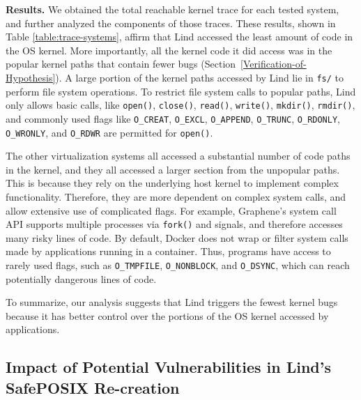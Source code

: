 {{{\noindent
\textbf{Results.}
We obtained the total reachable kernel trace for
each tested system,
and further analyzed the components of those traces. These results,
shown in Table \ref{table:trace-systems}, affirm that Lind accessed the
least amount of code in the OS
kernel. More importantly, all the kernel code it did access was in the
popular kernel paths that contain fewer bugs (Section~{\ref{Verification-of-Hypothesis}}).
A large portion of the kernel paths accessed by Lind lie in
\texttt{fs/} to perform file system operations.
To restrict file system calls to popular paths, Lind only allows basic calls,
like \texttt{open()}, \texttt{close()}, \texttt{read()}, \texttt{write()}, \texttt{mkdir()},
\texttt{rmdir()}, and commonly used flags like \texttt{O\_CREAT}, \texttt{O\_EXCL},
 \texttt{O\_APPEND}, \texttt{O\_TRUNC},
\texttt{O\_RDONLY}, \texttt{O\_WRONLY}, and \texttt{O\_RDWR} are
permitted for \texttt{open()}.

The other virtualization systems all accessed a substantial number of code
paths in the kernel, and they all accessed a larger section from the unpopular
paths. This is because they rely on the underlying host kernel to implement
complex functionality. Therefore, they are more dependent on complex system
calls, and allow extensive use of complicated flags.  For example, Graphene's
system call API supports multiple processes via \texttt{fork()} and signals,
and therefore accesses many risky lines of code. 
By default, Docker does not wrap
or filter system calls made by applications running in a container. Thus,
programs have access to rarely used flags, such as \texttt{O\_TMPFILE},
\texttt{O\_NONBLOCK}, and \texttt{O\_DSYNC}, which can reach potentially
dangerous lines of code.

To summarize, our analysis suggests that Lind triggers the fewest kernel bugs because
it has better control over the portions of the OS kernel accessed by applications.

\subsection{Impact of Potential Vulnerabilities in Lind's SafePOSIX Re-creation}
\label{Reachable-Kernel-Trace-Analysis-for-Repy-Sandbox}


}}}
